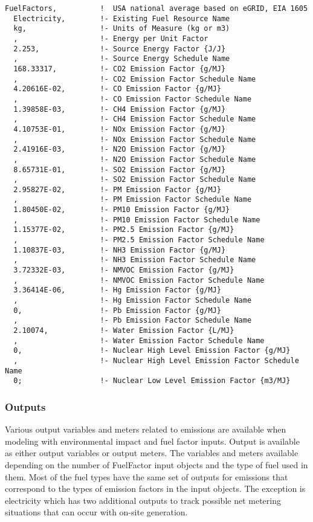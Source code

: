 \begin{lstlisting}
FuelFactors,          !  USA national average based on eGRID, EIA 1605
  Electricity,        !- Existing Fuel Resource Name
  kg,                 !- Units of Measure (kg or m3)
  ,                   !- Energy per Unit Factor
  2.253,              !- Source Energy Factor {J/J}
  ,                   !- Source Energy Schedule Name
  168.33317,          !- CO2 Emission Factor {g/MJ}
  ,                   !- CO2 Emission Factor Schedule Name
  4.20616E-02,        !- CO Emission Factor {g/MJ}
  ,                   !- CO Emission Factor Schedule Name
  1.39858E-03,        !- CH4 Emission Factor {g/MJ}
  ,                   !- CH4 Emission Factor Schedule Name
  4.10753E-01,        !- NOx Emission Factor {g/MJ}
  ,                   !- NOx Emission Factor Schedule Name
  2.41916E-03,        !- N2O Emission Factor {g/MJ}
  ,                   !- N2O Emission Factor Schedule Name
  8.65731E-01,        !- SO2 Emission Factor {g/MJ}
  ,                   !- SO2 Emission Factor Schedule Name
  2.95827E-02,        !- PM Emission Factor {g/MJ}
  ,                   !- PM Emission Factor Schedule Name
  1.80450E-02,        !- PM10 Emission Factor {g/MJ}
  ,                   !- PM10 Emission Factor Schedule Name
  1.15377E-02,        !- PM2.5 Emission Factor {g/MJ}
  ,                   !- PM2.5 Emission Factor Schedule Name
  1.10837E-03,        !- NH3 Emission Factor {g/MJ}
  ,                   !- NH3 Emission Factor Schedule Name
  3.72332E-03,        !- NMVOC Emission Factor {g/MJ}
  ,                   !- NMVOC Emission Factor Schedule Name
  3.36414E-06,        !- Hg Emission Factor {g/MJ}
  ,                   !- Hg Emission Factor Schedule Name
  0,                  !- Pb Emission Factor {g/MJ}
  ,                   !- Pb Emission Factor Schedule Name
  2.10074,            !- Water Emission Factor {L/MJ}
  ,                   !- Water Emission Factor Schedule Name
  0,                  !- Nuclear High Level Emission Factor {g/MJ}
  ,                   !- Nuclear High Level Emission Factor Schedule Name
  0;                  !- Nuclear Low Level Emission Factor {m3/MJ}
\end{lstlisting}

\subsubsection{Outputs}\label{outputs-029}

Various output variables and meters related to emissions are available when modeling with environmental impact and fuel factor inputs. Output is available as either output variables or output meters. The variables and meters available depending on the number of FuelFactor input objects and the type of fuel used in them. Most of the fuel types have the same set of outputs for emissions that correspond to the types of emission factors in the input objects. The exception is electricity which has two additional outputs to track possible net metering situations that can occur with on-site generation.

